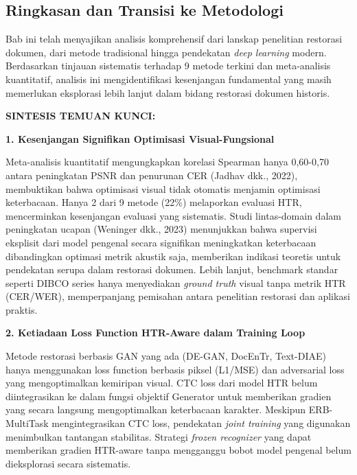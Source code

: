 \documentclass[12pt,a4paper]{book}
\begin{document}
\subsection{Ringkasan dan Transisi ke Metodologi}
\label{subsec:tinjauan-summary}

Bab ini telah menyajikan analisis komprehensif dari lanskap penelitian restorasi dokumen, dari metode tradisional hingga pendekatan \textit{deep learning} modern. Berdasarkan tinjauan sistematis terhadap 9 metode terkini dan meta-analisis kuantitatif, analisis ini mengidentifikasi kesenjangan fundamental yang masih memerlukan eksplorasi lebih lanjut dalam bidang restorasi dokumen historis.

\vspace{1ex}
\noindent\textbf{SINTESIS TEMUAN KUNCI:}
\vspace{0.5em}

\noindent\textbf{1. Kesenjangan Signifikan Optimisasi Visual-Fungsional}

Meta-analisis kuantitatif mengungkapkan korelasi Spearman hanya 0,60-0,70 antara peningkatan PSNR dan penurunan CER (Jadhav dkk., 2022), membuktikan bahwa optimisasi visual tidak otomatis menjamin optimisasi keterbacaan. Hanya 2 dari 9 metode (22\%) melaporkan evaluasi HTR, mencerminkan kesenjangan evaluasi yang sistematis. Studi lintas-domain dalam peningkatan ucapan (Weninger dkk., 2023) menunjukkan bahwa supervisi eksplisit dari model pengenal secara signifikan meningkatkan keterbacaan dibandingkan optimasi metrik akustik saja, memberikan indikasi teoretis untuk pendekatan serupa dalam restorasi dokumen. Lebih lanjut, benchmark standar seperti DIBCO series hanya menyediakan \textit{ground truth} visual tanpa metrik HTR (CER/WER), memperpanjang pemisahan antara penelitian restorasi dan aplikasi praktis.

\vspace{0.5em}
\noindent\textbf{2. Ketiadaan Loss Function HTR-Aware dalam Training Loop}

Metode restorasi berbasis GAN yang ada (DE-GAN, DocEnTr, Text-DIAE) hanya menggunakan loss function berbasis piksel (L1/MSE) dan adversarial loss yang mengoptimalkan kemiripan visual. CTC loss dari model HTR belum diintegrasikan ke dalam fungsi objektif Generator untuk memberikan gradien yang secara langsung mengoptimalkan keterbacaan karakter. Meskipun ERB-MultiTask mengintegrasikan CTC loss, pendekatan \textit{joint training} yang digunakan menimbulkan tantangan stabilitas. Strategi \textit{frozen recognizer} yang dapat memberikan gradien HTR-aware tanpa mengganggu bobot model pengenal belum dieksplorasi secara sistematis.
\end{document}

